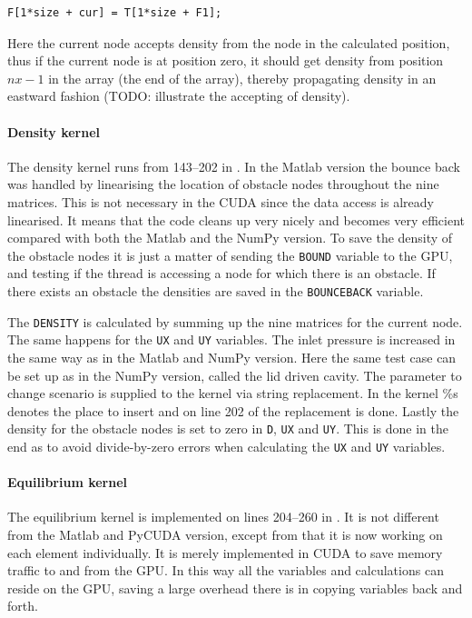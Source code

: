 \begin{verbatim}
F[1*size + cur] = T[1*size + F1];
\end{verbatim}

Here the current node accepts density from the node in the calculated position, thus if the current node is at position zero, it should get density from position $nx-1$ in the array (the end of the array), thereby propagating density in an eastward fashion (TODO: illustrate the accepting of density).


\paragraph{Density kernel}
The density kernel runs from 143--202 in . In the Matlab version the bounce back was handled by linearising the location of obstacle nodes throughout the nine matrices. This is not necessary in the CUDA since the data access is already linearised. It means that the code cleans up very nicely and becomes very efficient compared with both the Matlab and the NumPy version. To save the density of the obstacle nodes it is just a matter of sending the \texttt{BOUND} variable to the GPU, and testing if the thread is accessing a node for which there is an obstacle. If there exists an obstacle the densities are saved in the \texttt{BOUNCEBACK} variable.

The \texttt{DENSITY} is calculated by summing up the nine matrices for the current node. The same happens for the \texttt{UX} and \texttt{UY} variables. The inlet pressure is increased in the same way as in the Matlab and NumPy version. Here the same test case can be set up as in the NumPy version, called the lid driven cavity. The parameter to change scenario is supplied to the kernel via string replacement. In the kernel \%s denotes the place to insert and on line 202 of  the replacement is done. Lastly the density for the obstacle nodes is set to zero in \texttt{D}, \texttt{UX} and \texttt{UY}. This is done in the end as to avoid divide-by-zero errors when calculating the \texttt{UX} and \texttt{UY} variables.


\paragraph{Equilibrium kernel}
The equilibrium kernel is implemented on lines 204--260 in . It is not different from the Matlab and PyCUDA version, except from that it is now working on each element individually. It is merely implemented in CUDA to save memory traffic to and from the GPU. In this way all the variables and calculations can reside on the GPU, saving a large overhead there is in copying variables back and forth.

